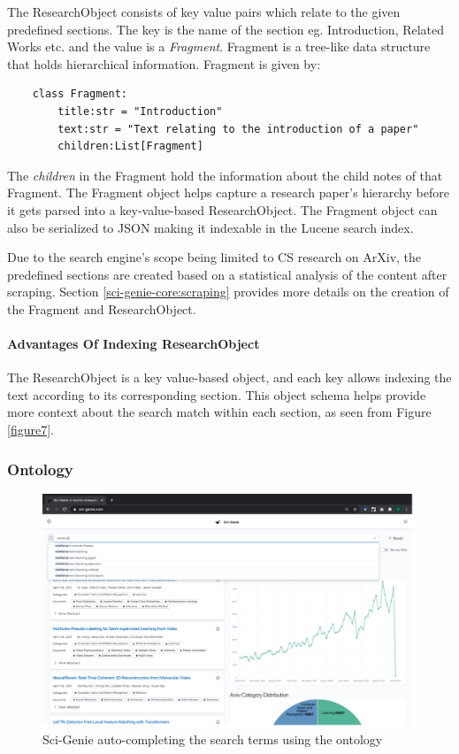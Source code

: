 The ResearchObject consists of key value pairs which relate to the given predefined sections. The key is the name of the section eg. Introduction, Related Works etc. and the value is a \textit{Fragment}. 
Fragment is a tree-like data structure that holds hierarchical information. Fragment is given by:
\begin{verbatim}
    class Fragment:
        title:str = "Introduction"
        text:str = "Text relating to the introduction of a paper"
        children:List[Fragment] 
\end{verbatim}    

The \textit{children} in the Fragment hold the information about the child notes of that Fragment. The Fragment object helps capture a research paper’s hierarchy before it gets parsed into a key-value-based ResearchObject. The Fragment object can also be serialized to JSON making it indexable in the Lucene search index.  

Due to the search engine’s scope being limited to CS research on ArXiv, the predefined sections are created based on a statistical analysis of the content after scraping. Section \ref{sci-genie-core:scraping} provides more details on the creation of the Fragment and ResearchObject. 

\paragraph{Advantages Of Indexing ResearchObject}
The ResearchObject is a key value-based object, and each key allows indexing the text according to its corresponding section. This object schema helps provide more context about the search match within each section, as seen from Figure \ref{figure7}. 

\subsubsection{Ontology}
\begin{figure}[h]
    \centering
    \includegraphics[width=\maxwidth{\textwidth}]{src/images/sci-genie-autocomp-example.png}
    \caption{Sci-Genie auto-completing the search terms using the ontology}
    \label{figure\arabic{figurecounter}}
\end{figure}

